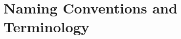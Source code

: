 \documentclass[journal,12pt,onecolumn,draftclsnofoot]{report}
\begin{document}
\section{Naming Conventions and Terminology}\label{sec:Naming}
 
\printnoidxglossaries

    
%    
%    
%    
%    
%    
%    
%    
%    
%    
%    








\end{document}

